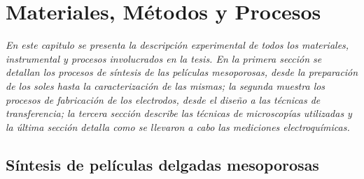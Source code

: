  \newcommand{\NoBiblioMat}[1]{
 \ifthenelse{\equal{#1}{verdadero}}{}{}
 \NoBiblioMat{verdadero}}


 \FormatoCapituloUnaLinea

 \chapter{Materiales, Métodos y Procesos}\label{chap:Materiales}

 \thispagestyle{empty}
	
  \noindent\textit{En este capitulo se presenta la descripción experimental de todos los materiales, instrumental y procesos involucrados en la tesis. En la primera sección se detallan los procesos de síntesis de las películas mesoporosas, desde la preparación de los soles hasta la caracterización de las mismas; la segunda muestra los procesos de fabricación de los electrodos, desde el diseño a las técnicas de transferencia; la tercera sección describe las técnicas de microscopías utilizadas y la última sección detalla como se llevaron a cabo las mediciones electroquímicas.}


 \vfill
 \minitoc
 \newpage


\section{Síntesis de películas delgadas mesoporosas}\label{sec:sintesis_mesoporosos}	
	
